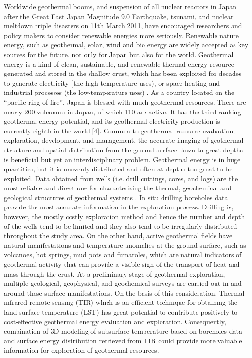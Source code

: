 %

Worldwide geothermal booms, and suspension of all nuclear reactors in Japan after the Great East Japan Magnitude 9.0 Earthquake, tsunami, and nuclear meltdown triple disasters on 11th March 2011, have encouraged researchers and policy makers to consider renewable energies more seriously. Renewable nature energy, such as geothermal, solar, wind and bio energy are widely accepted as key sources for the future, not only for Japan but also for the world. Geothermal energy is a kind of clean, sustainable, and renewable thermal energy resource generated and stored in the shallow crust, which has been exploited for decades to generate electricity (the high temperature uses), or space heating and industrial processes (the low-temperature uses) \cite{Barbier2002}. As a country located on the “pacific ring of fire”, Japan is blessed with much geothermal resources. There are nearly 200 volcanoes in Japan, of which 110 are active. It has the third ranking geothermal energy potential, and its geothermal electricity production is currently eighth in the world
[4]. Common to geothermal resource evaluation, exploration, development, and management, the accurate imaging of geothermal structure and spatial distribution from the ground surface down to great depths is beneficial but yet an interdisciplinary problem.
Geothermal energy is in huge quantities, but it is unevenly distributed and often at depths too great to be exploited. Data obtained from wells (i.e. drill cuttings, cores, and logs) are the most reliable and direct one for characterizing the thermal, geochemical and geological structures of geothermal systems \cite{Asaue2006, Teng2007}. In situ drilling boreholes data provide the most accurate information in the exploration process. Drilling is, however, the mostly costly exploration method and hence the number and depth of the wells tend to be limited and they also tend to be irregularly distributed throughout the study area. On the other hand, active geothermal fields have natural manifestations and temperature anomalies at the ground surface, such as volcanoes, hot springs, mud pots and fumaroles, which are natural indicators of geothermal activity that can provide a visible sign of the transport of heat and mass through the crust. At a preliminary stage of geothermal exploration, multiple geological, geophysical, and geochemical surveys are carried out in and around these surface manifestations. On the basis of this consideration, Thermal infrared remote sensing (TIR) which is an efficient technique for obtaining the land surface temperature (LST) has great potential to contribute positively to cost-effective geothermal energy evaluation and exploration. Consequently, combination of 3D modeling of subsurface temperature based on boreholes data and surface energy distribution retrieved from TIR could provide more valuable information for exploration of geothermal resources.

